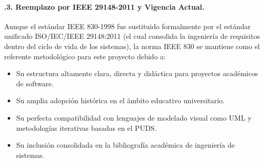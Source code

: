 \paragraph{.3. Reemplazo por IEEE 29148-2011 y Vigencia Actual.}\label{sec:ieee830_vigencia}
Aunque el estándar IEEE 830-1998 fue sustituido formalmente por el estándar unificado ISO/IEC/IEEE 29148:2011 (el cual consolida la ingeniería de requisitos dentro del ciclo de vida de los sistemas), la norma IEEE 830 se mantiene como el referente metodológico para este proyecto debido a:

\begin{itemize}
    \item Su estructura altamente clara, directa y didáctica para proyectos académicos de software.
    \item Su amplia adopción histórica en el ámbito educativo universitario.
    \item Su perfecta compatibilidad con lenguajes de modelado visual como UML y metodologías iterativas basadas en el PUDS.
    \item Su inclusión consolidada en la bibliografía académica de ingeniería de sistemas.
\end{itemize}
